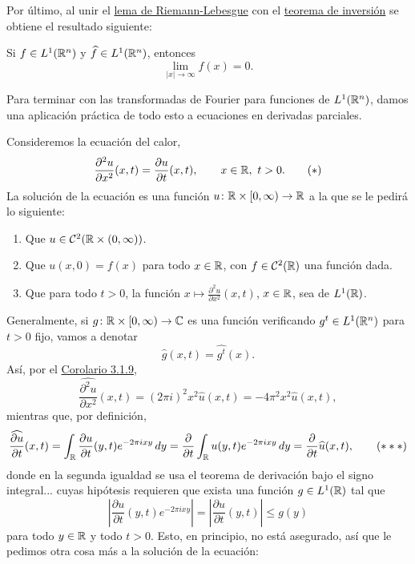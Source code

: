 \documentclass[a4paper, 11pt, oneside]{report}
\begin{document}
Por último, al unir el \hyperref[teo:3.1.11]{\color{c1}lema de Riemann-Lebesgue} con el \hyperref[teo:3.2.3]{\color{c1}teorema de inversión} se obtiene el resultado siguiente:

\begin{corollary}
  Si $f \in L^1(\mathbb R^n)$ y $\widehat{f}\in L^1(\mathbb R^n)$, entonces
  \[\lim_{|x| \to \infty}f(x) = 0.\]
\end{corollary}

Para terminar con las transformadas de Fourier para funciones de $L^1(\mathbb R^n)$, damos una aplicación práctica de todo esto a ecuaciones en derivadas parciales.

\begin{example}
  Consideremos la ecuación del calor,
  \[\frac{\partial^2 u}{\partial x^2}(x,t) = \frac{\partial u}{\partial t}(x,t), \qquad x \in \mathbb R, \ t >0. \tag{$\ast$}\]
  La solución de la ecuación es una función $u \colon \mathbb R \times [0,\infty) \to \mathbb R$ a la que se le pedirá lo siguiente:
  \begin{enumerate}
    \item Que $u \in \mathcal{C}^2(\mathbb R \times (0,\infty))$.
    \item Que $u(x,0) = f(x)$ para todo $x \in \mathbb R$, con $f \in \mathcal{C}^2(\mathbb R)$ una función dada.
    \item Que para todo $t>0$, la función $x \mapsto \frac{\partial^2 u}{\partial x^2}(x,t)$, $x \in \mathbb R$, sea de $L^1(\mathbb R)$.
  \end{enumerate}
  Generalmente, si $g \colon \mathbb R \times [0,\infty) \to \mathbb C$ es una función verificando $g^t \in L^1(\mathbb R^n)$ para $t > 0$ fijo, vamos a denotar
  \[\widehat{g}(x,t) = \widehat{g^t}(x).\]
  Así, por el \hyperref[cor:3.1.9]{\color{c1}Corolario 3.1.9},
  \[\widehat{\frac{\partial^2 u}{\partial x^2}}(x,t) = (2\pi i)^2 x^2\widehat{u}(x,t) = -4\pi^2 x^2\widehat{u}(x,t), \tag{$\ast\ast$}\]
  mientras que, por definición,
  \[\widehat{\frac{\partial u}{\partial t}}(x,t) = \int_{\mathbb R} \frac{\partial u}{\partial t}(y,t)e^{-2\pi i xy} \, dy = \frac{\partial }{\partial t}\int_\mathbb R u(y,t) e^{-2\pi i xy} \, dy = \frac{\partial}{\partial t}\widehat{u}(x,t), \tag{$\ast\ast\ast$}\]
  donde en la segunda igualdad se usa el teorema de derivación bajo el signo integral... cuyas hipótesis requieren que exista una función $g \in L^1(\mathbb R)$ tal que
  \[\left|\frac{\partial u}{\partial t}(y,t)e^{-2\pi i xy} \right| = \left|\frac{\partial u}{\partial t}(y,t) \right| \leq g(y)\]
  para todo $y \in \mathbb R$ y todo $t > 0$. Esto, en principio, no está asegurado, así que le pedimos otra cosa más a la solución de la ecuación:

\end{example}
\end{document}
